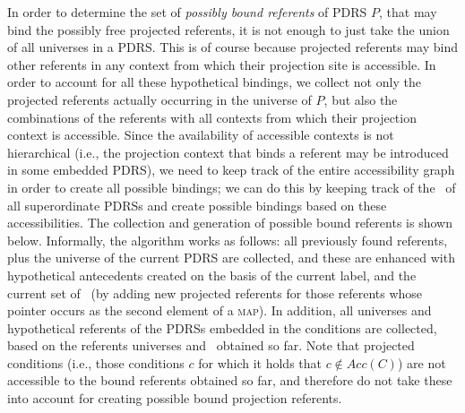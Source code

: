 In order to determine the set of \textit{possibly bound referents} of PDRS
$P$, that may bind the possibly free projected referents, it is not enough
to just take the union of all universes in a PDRS. This is of course because
projected referents may bind other referents in any context from which their
projection site is accessible. In order to account for all these
hypothetical bindings, we collect not only the projected referents actually
occurring in the universe of $P$, but also the combinations of the referents
with all contexts from which their projection context is accessible. Since
the availability of accessible contexts is not hierarchical (i.e., the
projection context that binds a referent may be introduced in some embedded
PDRS), we need to keep track of the entire accessibility graph in order to
create all possible bindings; we can do this by keeping track of the
\MAPs~of all superordinate PDRSs and create possible bindings based on these
accessibilities. The collection and generation of possible bound referents
is shown below.  Informally, the algorithm works as follows: all previously
found referents, plus the universe of the current PDRS are collected, and
these are enhanced with hypothetical antecedents created on the basis of the
current label, and the current set of \MAPs~(by adding new projected
referents for those referents whose pointer occurs as the second element of
a \textsc{map}). In addition, all universes and hypothetical referents of
the PDRSs embedded in the conditions are collected, based on the referents
universes and \MAPs~obtained so far. Note that projected conditions (i.e.,
those conditions $c$ for which it holds that $c \notin Acc(C)$) are not
accessible to the bound referents obtained so far, and therefore do not take
these into account for creating possible bound projection referents.

